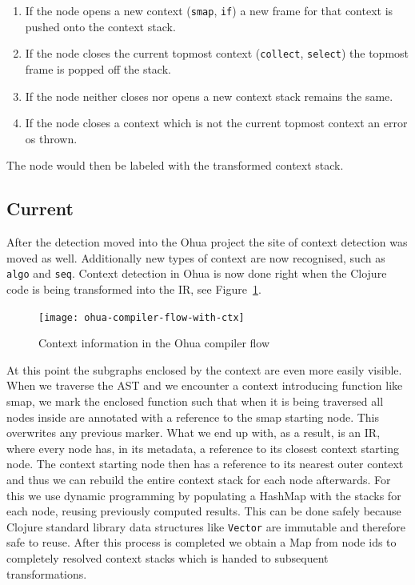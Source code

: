 \begin{enumerate}
  \item If the node opens a new context (\texttt{smap}, \texttt{if}) a new frame for that context is pushed onto the context stack.
  \item If the node closes the current topmost context (\texttt{collect}, \texttt{select}) the topmost frame is popped off the stack.
  \item If the node neither closes nor opens a new context stack remains the same.
  \item If the node closes a context which is not the current topmost context an error os thrown.
\end{enumerate}

The node would then be labeled with the transformed context stack.

\subsection{Current}


After the detection moved into the Ohua project the site of context detection was moved as well.
Additionally new types of context are now recognised, such as \texttt{algo} and \texttt{seq}.
Context detection in Ohua is now done right when the Clojure code is being transformed into the IR, see Figure~\ref{fig:ohua-compiler-flow-with-ctx}.

\begin{figure}
  \texttt{[image: ohua-compiler-flow-with-ctx]}
  \caption{Context information in the Ohua compiler flow}
  \label{fig:ohua-compiler-flow-with-ctx}
\end{figure}

At this point the subgraphs enclosed by the context are even more easily visible.
When we traverse the AST and we encounter a context introducing function like smap, we mark the enclosed function such that when it is being traversed all nodes inside are annotated with a reference to the smap starting node.
This overwrites any previous marker.
What we end up with, as a result, is an IR, where every node has, in its metadata, a reference to its closest context starting node.
The context starting node then has a reference to its nearest outer context and thus we can rebuild the entire context stack for each node afterwards.
For this we use dynamic programming by populating a HashMap with the stacks for each node, reusing previously computed results.
This can be done safely because Clojure standard library data structures like \texttt{Vector} are immutable and therefore safe to reuse.
After this process is completed we obtain a Map from node ids to completely resolved context stacks which is handed to subsequent transformations.

